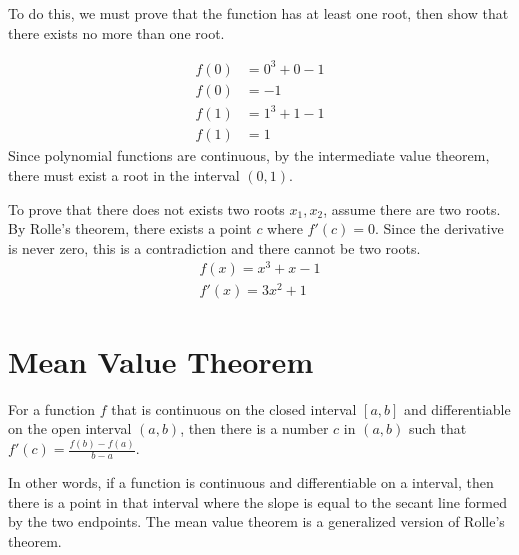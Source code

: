 \documentclass{article}
\theoremstyle{mytheoremstyle}
\theoremstyle{mytheoremstyle}
\theoremstyle{myproblemstyle}
\begin{document}
    To do this, we must prove that the function has at least one root, then show
    that there exists no more than one root.

    \begin{align*}
        f(0) &= 0^3 +0 - 1 \\
        f(0) &= -1 \\
        f(1) &= 1^3 + 1 - 1 \\
        f(1) &= 1
    \end{align*}
    Since polynomial functions are continuous, by the intermediate value
    theorem, there must exist a root in the interval $(0,1)$.

    To prove that there does not exists two roots $x_1,x_2$, assume there are two roots.
    By Rolle's theorem, there exists a point $c$ where $f'(c)=0$. Since the
    derivative is never zero, this is a contradiction and there cannot be two
    roots.
    \begin{align*}
        f(x) = x^3 +x - 1 \\
        f'(x) = 3x^2 + 1
    \end{align*}

    \section*{Mean Value Theorem}
    For a function $f$ that is continuous on the closed interval $[a,b]$ and
    differentiable on the open interval $(a,b)$, then there is a number $c$ in
    $(a,b)$ such that $f'(c)= \frac{f(b)-f(a)}{b-a}$.

    In other words, if a function is continuous and differentiable on a
    interval, then there is a point in that interval where the slope is equal to
    the secant line formed by the two endpoints. The mean value theorem is a
    generalized version of Rolle's theorem. \\
\end{document}
